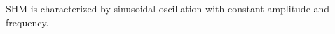 \documentclass[preview]{standalone}
\begin{document}
\begin{center}
SHM is characterized by sinusoidal oscillation with constant amplitude and frequency.
\end{center}
\end{document}
